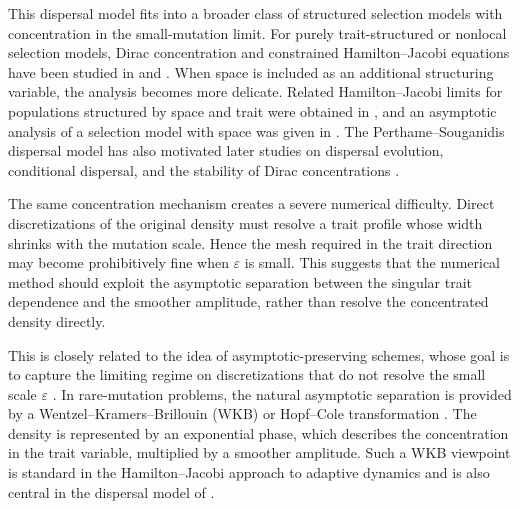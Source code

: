 \documentclass[11pt]{article}
\numberwithin{equation}{section}
\begin{document}
This dispersal model fits into a broader class of structured selection models with concentration in the small-mutation limit. For purely trait-structured or nonlocal selection models, Dirac concentration and constrained Hamilton--Jacobi equations have been studied in \cite{DesvillettesJabinMischlerRaoul} and \cite{LorzMirrahimiPerthame}. When space is included as an additional structuring variable, the analysis becomes more delicate. 
Related Hamilton--Jacobi limits for populations structured by space and trait were obtained in \cite{BouinMirrahimi}, and an asymptotic analysis of a selection model with space was given in \cite{MirrahimiPerthame}. 
The Perthame--Souganidis dispersal model has also motivated later studies on dispersal evolution, conditional dispersal, and the stability of Dirac concentrations \cite{HaoLamLou2019, Lam2017,LamLouPerthame2023}.



The same concentration mechanism creates a severe numerical difficulty.  Direct
discretizations of the original density must resolve a trait profile whose
width shrinks with the mutation scale.  Hence the mesh required in the trait
direction may become prohibitively fine when \(\varepsilon\) is small.  This
suggests that the numerical method should exploit the asymptotic separation
between the singular trait dependence and the smoother amplitude, rather than
resolve the concentrated density directly.

This is closely related to the idea of asymptotic-preserving schemes, whose
goal is to capture the limiting regime on discretizations that do not resolve
the small scale \(\varepsilon\) \cite{JinAP}.  In rare-mutation problems, the
natural asymptotic separation is provided by a Wentzel–Kramers–Brillouin (WKB) \cite{BenderOrszag1999WKB} or Hopf--Cole
transformation \cite{BarlesPerthame2008}.  The density is represented by an exponential phase, which
describes the concentration in the trait variable, multiplied by a smoother
amplitude.  Such a WKB viewpoint is standard in the Hamilton--Jacobi approach
to adaptive dynamics \cite{BarlesPerthame} and is also central in the
dispersal model of \cite{PerthameSouganidis}.
\end{document}
